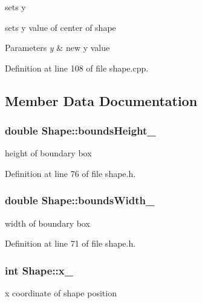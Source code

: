sets y 

sets y value of center of shape


\begin{DoxyParams}{Parameters}
{\em y} & new y value \\
\hline
\end{DoxyParams}


Definition at line 108 of file shape.\+cpp.



\subsection{Member Data Documentation}
\hypertarget{class_shape_a99e0e92930da8380eedae20255347b50}{}
\subsubsection[{bounds\+Height\+\_\+}]{\setlength{\rightskip}{0pt plus 5cm}double Shape\+::bounds\+Height\+\_\+\hspace{0.3cm}{\ttfamily [protected]}}\label{class_shape_a99e0e92930da8380eedae20255347b50}
height of boundary box 

Definition at line 76 of file shape.\+h.

\hypertarget{class_shape_a8d608b3645ea020c08eaabfd112bd5d4}{}
\subsubsection[{bounds\+Width\+\_\+}]{\setlength{\rightskip}{0pt plus 5cm}double Shape\+::bounds\+Width\+\_\+\hspace{0.3cm}{\ttfamily [protected]}}\label{class_shape_a8d608b3645ea020c08eaabfd112bd5d4}
width of boundary box 

Definition at line 71 of file shape.\+h.

\hypertarget{class_shape_ac9f855989a11f0baf8c6a0a494270a2c}{}
\subsubsection[{x\+\_\+}]{\setlength{\rightskip}{0pt plus 5cm}int Shape\+::x\+\_\+\hspace{0.3cm}{\ttfamily [protected]}}\label{class_shape_ac9f855989a11f0baf8c6a0a494270a2c}
x coordinate of shape position 

